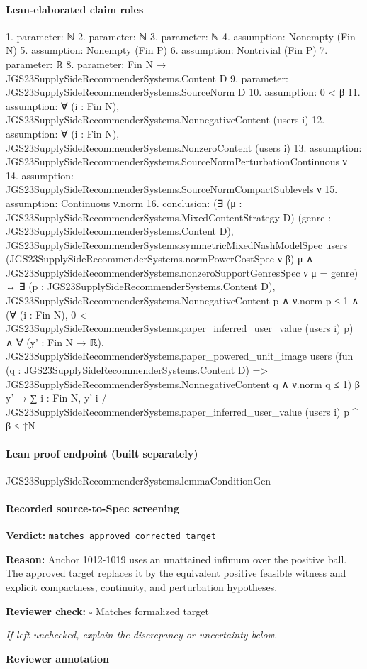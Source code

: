 \documentclass[10pt]{article}
\newcommand{\reviewerbox}{%
  \par\noindent\fbox{\parbox{0.96\linewidth}{\rule{0pt}{0.38in}}}\par
}
\newcommand{\reviewmatch}[1]{%
  \par\noindent\textbf{Reviewer check:} $\square$\; #1\par
  \noindent\emph{If left unchecked, explain the discrepancy or uncertainty below.}\par
}
\begin{document}
\paragraph{Lean-elaborated claim roles}\begin{ReviewVerbatim}
1. parameter: ℕ
2. parameter: ℕ
3. parameter: ℕ
4. assumption: Nonempty (Fin N)
5. assumption: Nonempty (Fin P)
6. assumption: Nontrivial (Fin P)
7. parameter: ℝ
8. parameter: Fin N → JGS23SupplySideRecommenderSystems.Content D
9. parameter: JGS23SupplySideRecommenderSystems.SourceNorm D
10. assumption: 0 < β
11. assumption: ∀ (i : Fin N), JGS23SupplySideRecommenderSystems.NonnegativeContent (users i)
12. assumption: ∀ (i : Fin N), JGS23SupplySideRecommenderSystems.NonzeroContent (users i)
13. assumption: JGS23SupplySideRecommenderSystems.SourceNormPerturbationContinuous ν
14. assumption: JGS23SupplySideRecommenderSystems.SourceNormCompactSublevels ν
15. assumption: Continuous ν.norm
16. conclusion: (∃ (μ : JGS23SupplySideRecommenderSystems.MixedContentStrategy D) (genre : JGS23SupplySideRecommenderSystems.Content D),
    JGS23SupplySideRecommenderSystems.symmetricMixedNashModelSpec users
        (JGS23SupplySideRecommenderSystems.normPowerCostSpec ν β) μ ∧
      JGS23SupplySideRecommenderSystems.nonzeroSupportGenresSpec ν μ = {genre}) ↔
  ∃ (p : JGS23SupplySideRecommenderSystems.Content D),
    JGS23SupplySideRecommenderSystems.NonnegativeContent p ∧
      ν.norm p ≤ 1 ∧
        (∀ (i : Fin N), 0 < JGS23SupplySideRecommenderSystems.paper_inferred_user_value (users i) p) ∧
          ∀ (y' : Fin N → ℝ),
            JGS23SupplySideRecommenderSystems.paper_powered_unit_image users
                (fun (q : JGS23SupplySideRecommenderSystems.Content D) =>
                  JGS23SupplySideRecommenderSystems.NonnegativeContent q ∧ ν.norm q ≤ 1)
                β y' →
              ∑ i : Fin N, y' i / JGS23SupplySideRecommenderSystems.paper_inferred_user_value (users i) p ^ β ≤ ↑N
\end{ReviewVerbatim}

\paragraph{Lean proof endpoint (built separately)}\begin{ReviewVerbatim}
JGS23SupplySideRecommenderSystems.lemmaConditionGen
\end{ReviewVerbatim}

\paragraph{Recorded source-to-Spec screening}
\textbf{Verdict:} \texttt{matches\_approved\_corrected\_target}
\\
{\raggedright
\textbf{Reason:} Anchor 1012-\allowbreak{}1019 uses an unattained infimum over the positive ball.\allowbreak{}  The approved target replaces it by the equivalent positive feasible witness and explicit compactness, continuity, and perturbation hypotheses.\allowbreak{}
\par}
\reviewmatch{Matches formalized target}
\noindent\textbf{Reviewer annotation}\par
\reviewerbox
\clearpage
\hypertarget{source-claim-b91906e2d87f0528}{}
\end{document}
